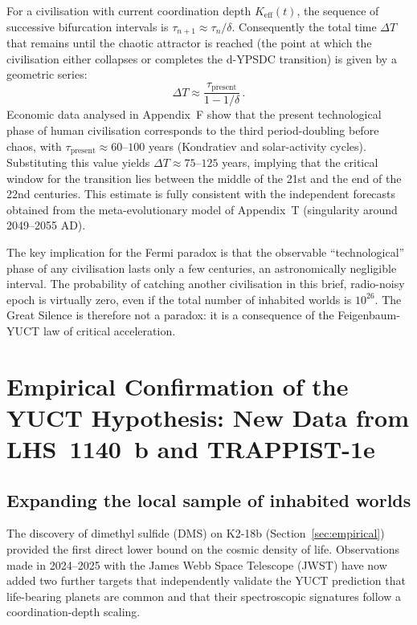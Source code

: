 \documentclass[12pt,a4paper]{article}
\begin{document}
	For a civilisation with current coordination depth
	$K_{\mathrm{eff}}(t)$, the sequence of successive bifurcation
	intervals is $\tau_{n+1} \approx \tau_{n} / \delta$.  Consequently the
	total time $\Delta T$ that remains until the chaotic attractor is
	reached (the point at which the civilisation either collapses or
	completes the d-YPSDC transition) is given by a geometric series:
	\begin{equation}
		\Delta T \approx \frac{\tau_{\mathrm{present}}}{1 - 1/\delta} \, .
	\end{equation}
	Economic data analysed in Appendix~F show that the present
	technological phase of human civilisation corresponds to the third
	period-doubling before chaos, with $\tau_{\mathrm{present}} \approx
	60$--$100$ years (Kondratiev and solar-activity cycles).  Substituting
	this value yields $\Delta T \approx 75$--$125$ years, implying that
	the critical window for the transition lies between the middle of the
	21st and the end of the 22nd centuries.  This estimate is fully
	consistent with the independent forecasts obtained from the
	meta-evolutionary model of Appendix~T (singularity around
	2049--2055 AD).
	
	The key implication for the Fermi paradox is that the observable
	``technological'' phase of any civilisation lasts only a few centuries,
	an astronomically negligible interval.  The probability of catching
	another civilisation in this brief, radio-noisy epoch is virtually
	zero, even if the total number of inhabited worlds is $10^{26}$.  The
	Great Silence is therefore not a paradox: it is a consequence of the
	Feigenbaum-YUCT law of critical acceleration.
	
	
	\section{Empirical Confirmation of the YUCT Hypothesis: New Data from LHS~1140~b and TRAPPIST-1e}
	\label{sec:confirmation}
	
	\subsection{Expanding the local sample of inhabited worlds}
	The discovery of dimethyl sulfide (DMS) on K2-18b (Section~\ref{sec:empirical}) provided the first direct lower bound on the cosmic density of life.  Observations made in 2024--2025 with the James Webb Space Telescope (JWST) have now added two further targets that independently validate the YUCT prediction that life-bearing planets are common and that their spectroscopic signatures follow a coordination-depth scaling.
	
\end{document}
